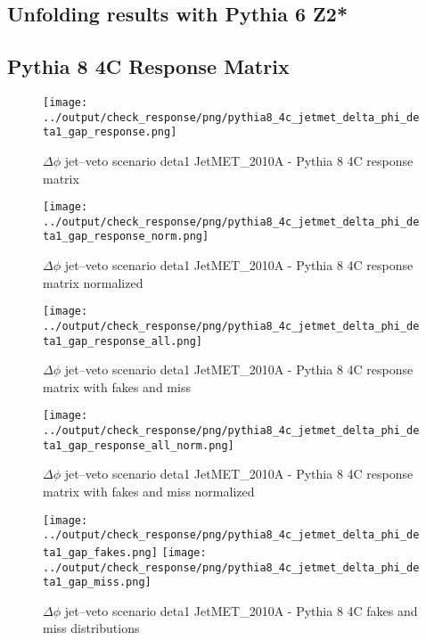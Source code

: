 \documentclass[11pt]{book}
\begin{document}
\clearpage
\subsection{Unfolding results with Pythia 6 Z2*}


\clearpage
\subsection{Pythia 8 4C Response Matrix}


\begin{figure}[ht]
\centering
\texttt{[image: ../output/check\_response/png/pythia8\_4c\_jetmet\_delta\_phi\_deta1\_gap\_response.png]}
\caption{$\Delta\phi$ jet--veto scenario deta1 JetMET\_2010A - Pythia 8 4C response matrix}
\label{p8_jetmet_delta_phi_deta1_gap_response}
\end{figure}

\begin{figure}[ht]
\centering
\texttt{[image: ../output/check\_response/png/pythia8\_4c\_jetmet\_delta\_phi\_deta1\_gap\_response\_norm.png]}
\caption{$\Delta\phi$ jet--veto scenario deta1 JetMET\_2010A - Pythia 8 4C response matrix normalized}
\label{p8_jetmet_delta_phi_deta1_gap_response_norm}
\end{figure}

\begin{figure}[ht]
\centering
\texttt{[image: ../output/check\_response/png/pythia8\_4c\_jetmet\_delta\_phi\_deta1\_gap\_response\_all.png]}
\caption{$\Delta\phi$ jet--veto scenario deta1 JetMET\_2010A - Pythia 8 4C response matrix with fakes and miss}
\label{p8_jetmet_delta_phi_deta1_gap_response_all}
\end{figure}

\begin{figure}[ht]
\centering
\texttt{[image: ../output/check\_response/png/pythia8\_4c\_jetmet\_delta\_phi\_deta1\_gap\_response\_all\_norm.png]}
\caption{$\Delta\phi$ jet--veto scenario deta1 JetMET\_2010A - Pythia 8 4C response matrix with fakes and miss normalized}
\label{p8_jetmet_delta_phi_deta1_gap_response_all_norm}
\end{figure}

\begin{figure}[ht]
\centering
\texttt{[image: ../output/check\_response/png/pythia8\_4c\_jetmet\_delta\_phi\_deta1\_gap\_fakes.png]}
\texttt{[image: ../output/check\_response/png/pythia8\_4c\_jetmet\_delta\_phi\_deta1\_gap\_miss.png]}
\caption{$\Delta\phi$ jet--veto scenario deta1 JetMET\_2010A - Pythia 8 4C fakes and miss distributions}
\label{p8_jetmet_delta_phi_deta1_gap_fakesmiss}
\end{figure}
\end{document}

